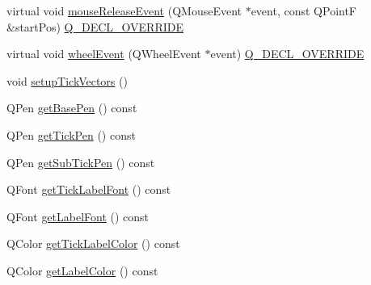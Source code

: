 \begin{DoxyCompactItemize}
\item 
virtual void \mbox{\hyperlink{class_q_c_p_axis_a780bee321fc6476e5fc49c4980291a01}{mouse\+Release\+Event}} (Q\+Mouse\+Event $\ast$event, const Q\+PointF \&start\+Pos) \mbox{\hyperlink{qcustomplot_8h_a42cc5eaeb25b85f8b52d2a4b94c56f55}{Q\+\_\+\+D\+E\+C\+L\+\_\+\+O\+V\+E\+R\+R\+I\+DE}}
\item 
virtual void \mbox{\hyperlink{class_q_c_p_axis_aa850f195d7cc470c53809d0fff5e444d}{wheel\+Event}} (Q\+Wheel\+Event $\ast$event) \mbox{\hyperlink{qcustomplot_8h_a42cc5eaeb25b85f8b52d2a4b94c56f55}{Q\+\_\+\+D\+E\+C\+L\+\_\+\+O\+V\+E\+R\+R\+I\+DE}}
\item 
void \mbox{\hyperlink{class_q_c_p_axis_a57d9e961bae7d62f5b4e1f143e660c78}{setup\+Tick\+Vectors}} ()
\item 
Q\+Pen \mbox{\hyperlink{class_q_c_p_axis_a8cd3764c6a4ce9c3d7d913e81cad0a50}{get\+Base\+Pen}} () const
\item 
Q\+Pen \mbox{\hyperlink{class_q_c_p_axis_afe7d57415cbbf31e5549a5cc40b6f8d8}{get\+Tick\+Pen}} () const
\item 
Q\+Pen \mbox{\hyperlink{class_q_c_p_axis_aad7739c229b292ddab0b3a43a5676f54}{get\+Sub\+Tick\+Pen}} () const
\item 
Q\+Font \mbox{\hyperlink{class_q_c_p_axis_a694ab8b4240f3c90a866372e3dcb364f}{get\+Tick\+Label\+Font}} () const
\item 
Q\+Font \mbox{\hyperlink{class_q_c_p_axis_aeac21c907d2516af9cde9a463043d671}{get\+Label\+Font}} () const
\item 
Q\+Color \mbox{\hyperlink{class_q_c_p_axis_a8d00d5b78ecfbebbea5a8161bddb9a17}{get\+Tick\+Label\+Color}} () const
\item 
Q\+Color \mbox{\hyperlink{class_q_c_p_axis_ae914abd56afa570cb9f2ab50e59c0f0e}{get\+Label\+Color}} () const
\end{DoxyCompactItemize}

